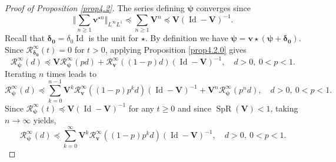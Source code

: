 \documentclass[reqno,final,11pt]{amsart}
\theoremstyle{plain}
\theoremstyle{definition}
\theoremstyle{remark}
\newcommand{\Res}{\mathcal{R}}
\DeclareMathOperator{\spr}{SpR}
\DeclareMathOperator{\Id}{Id}
\begin{document}
\begin{proof}[Proof of Proposition \ref{prop4.2}]\label{proofs A}
	The series defining $\bm{\psi}$ converges since
	\[\Big\Vert\sum_{n\geq 1} \bm{v}^{\star n}\Big\Vert_{L^{\infty}L^1} \preceq \sum_{n\geq 1} \bm{V}^n \preceq \bm{V}(\Id-\bm{V})^{-1}.\] 
	Recall that $\bm{\delta_0} = \delta_0 \Id $ is the unit for $\star$. By definition we have $\bm{\psi} = \bm{v} \star (\bm{\psi} + \bm{\delta_0})$. Since $\Res_{\bm{\delta_0}}^{\infty}(t) = 0$ for $t>0$, applying Proposition \ref{prop4.2.0} gives
	\[\Res^{\infty}_{\bm{\psi}}(d) \preceq \bm{V} \Res^{\infty}_{\bm{\psi}}(pd) + \Res^{\infty}_{\bm{v}}((1-p)d)(\Id-\bm{V})^{-1}, \quad d>0, \ 0<p<1. \]
	Iterating $n$ times leads to
	\[\Res^{\infty}_{\bm{\psi}}(d) \preceq \sum_{k=0}^{n-1} \bm{V}^k \Res^{\infty}_{\bm{v}}((1-p)p^kd)(\Id-\bm{V})^{-1} + \bm{V}^{n} \Res^{\infty}_{\bm{\psi}}(p^n d), \quad d>0, \ 0<p<1. \]
	Since $\Res_{\bm{\psi}}^{\infty}(t) \preceq \bm{V}(\Id-\bm{V})^{-1}$ for any $t\geq 0$ and since $\spr(\bm{V})<1$, taking $n\to\infty$ yields,
	\[\Res^{\infty}_{\bm{\psi}}(d) \preceq \sum_{k=0}^{\infty} \bm{V}^k \Res^{\infty}_{\bm{v}}((1-p)p^kd)(\Id-\bm{V})^{-1}, \quad d>0, \ 0<p<1. \]
\end{proof}
\end{document}
